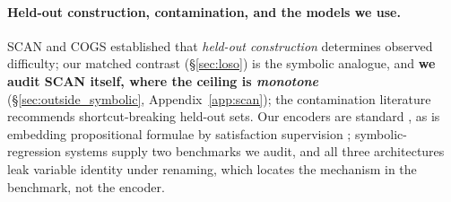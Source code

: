 \paragraph{Held-out construction, contamination, and the models we use.} SCAN \citep{lake2018generalization} and COGS \citep{kim2020cogs} established that \emph{held-out construction} determines observed difficulty; our matched contrast (\S\ref{sec:loso}) is the symbolic analogue, and \textbf{we audit SCAN itself, where the ceiling is \emph{monotone}} (\S\ref{sec:outside_symbolic}, Appendix~\ref{app:scan}); the contamination literature \citep{jacovi2023stop, zhou2023don} recommends shortcut-breaking held-out sets. Our encoders are standard \citep{tai2015improved, xu2019powerful, vaswani2017attention, lample2019deep, schroff2015facenet, wen2016discriminative, snell2017prototypical}, as is embedding propositional formulae by satisfaction supervision \citep{xie2019embedding}; symbolic-regression systems \citep{udrescu2020ai, biggio2021neural, cranmer2019learning} supply two benchmarks we audit, and all three architectures leak variable identity under renaming, which locates the mechanism in the benchmark, not the encoder.
